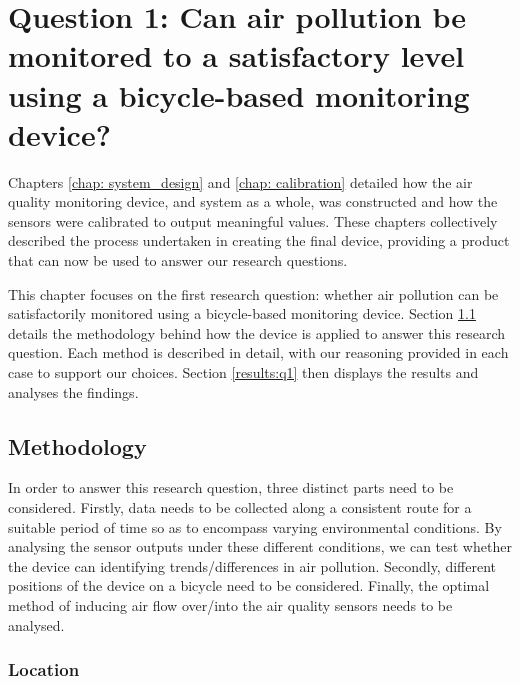 \documentclass[11pt]{report}
\begin{document}

\chapter{Question 1: Can air pollution be monitored to a satisfactory level using a bicycle-based monitoring device?} \label{chap:q1}

Chapters \ref{chap: system_design} and \ref{chap: calibration} detailed how the air quality monitoring device, and system as a whole, was constructed and how the sensors were calibrated to output meaningful values. These chapters collectively described the process undertaken in creating the final device, providing a product that can now be used to answer our research questions.

This chapter focuses on the first research question: whether air pollution can be satisfactorily monitored using a bicycle-based monitoring device. Section \ref{meth:q1} details the methodology behind how the device is applied to answer this research question. Each method is described in detail, with our reasoning provided in each case to support our choices. Section \ref{results:q1} then displays the results and analyses the findings.

\section{Methodology} \label{meth:q1}

In order to answer this research question, three distinct parts need to be considered. Firstly, data needs to be collected along a consistent route for a suitable period of time so as to encompass varying environmental conditions. By analysing the sensor outputs under these different conditions, we can test whether the device can identifying trends/differences in air pollution. Secondly, different positions of the device on a bicycle need to be considered. Finally, the optimal method of inducing air flow over/into the air quality sensors needs to be analysed. %

\subsection{Location} \label{location}
\end{document}
